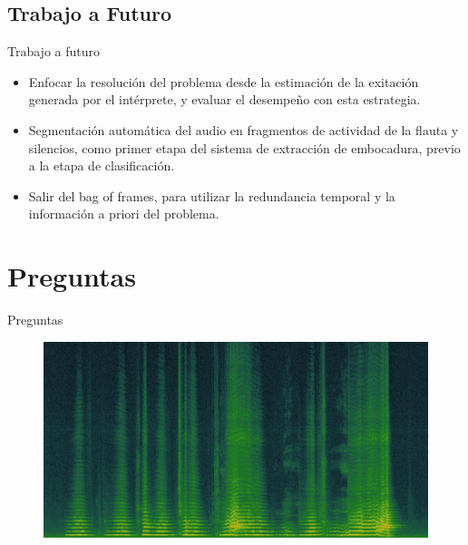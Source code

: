 \documentclass[aspectratio=169]{beamer}
\begin{document}
\subsection{Trabajo a Futuro}

\begin{frame}{Trabajo a futuro}
\begin{itemize} 

  \item Enfocar la resolución del problema desde la estimación de la exitación generada por el intérprete, y evaluar el desempeño con esta estrategia.
  
  \item Segmentación automática del audio en fragmentos de actividad de la flauta y silencios, como primer etapa del sistema de extracción de embocadura, previo a la etapa de clasificación.
   
  \item Salir del bag of frames, para utilizar la redundancia temporal y la información a priori del problema.

\end{itemize}
\end{frame}

\section*{Preguntas}
\begin{frame}{Preguntas}
\begin{figure}[H]
\begin{center}
\includegraphics[width=1\textwidth]{preguntas} 
\end{center}
\end{figure}

\end{frame}
\end{document}
